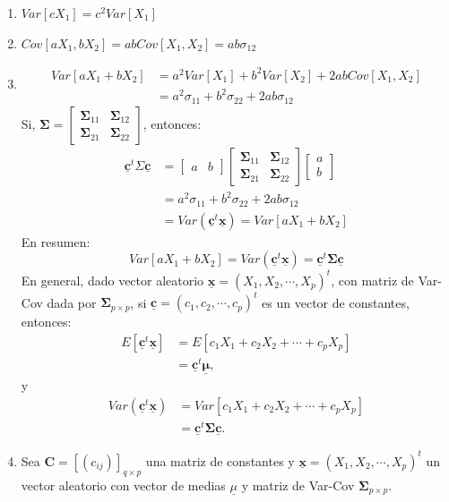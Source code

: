\documentclass[
]{book}
\theoremstyle{definition}
\theoremstyle{definition}
\theoremstyle{definition}
\theoremstyle{definition}
\theoremstyle{remark}
\begin{document}
\begin{enumerate}
\def\labelenumi{\arabic{enumi}.}
\setcounter{enumi}{2}
\item
  \(Var[cX_1]=c^2 Var[X_1]\)
\item
  \(Cov[aX_1,bX_2]=abCov[X_1,X_2]=ab\sigma_{12}\)
\item
  \begin{align*}
  Var[aX_1+bX_2]&=a^2Var[X_1]+b^2Var[X_2]+2abCov[X_1,X_2]\\
  &=a^2\sigma_{11}+b^2\sigma_{22}+2ab\sigma_{12}
  \end{align*}
  Si, \(\mathbf{\Sigma} = \begin{bmatrix} \mathbf{\Sigma}_{11} & \mathbf{\Sigma}_{12} \\ \mathbf{\Sigma}_{21} & \mathbf{\Sigma}_{22} \end{bmatrix}\), entonces:
  \begin{align*}
  \underline{\mathbf{c}}^t \Sigma \underline{\mathbf{c}}&= \begin{bmatrix}
  a & b
  \end{bmatrix}\begin{bmatrix}
  \mathbf{\Sigma}_{11} & \mathbf{\Sigma}_{12} \\
  \mathbf{\Sigma}_{21} & \mathbf{\Sigma}_{22}
  \end{bmatrix}\begin{bmatrix}
  a \\ b
  \end{bmatrix}\\&
    =a^2\sigma_{11}+b^2\sigma_{22}+2ab\sigma_{12}\\
  &=
  Var(\underline{\mathbf{c}}^t\underline{\mathbf{x}})=Var[aX_1+bX_2]
  \end{align*}
  En resumen:
  \[
  Var[aX_1+bX_2]=Var(\underline{\mathbf{c}}^t\underline{\mathbf{x}})=\underline{\mathbf{c}}^t \mathbf{\Sigma} \underline{\mathbf{c}}
  \]
  En general, dado vector aleatorio \(\underline{\mathbf{x}}=(X_1,X_2,\cdots, X_p)^t\), con matriz de Var-Cov dada por \(\mathbf{\Sigma}_{p \times p}\), si \(\underline{\mathbf{c}}=(c_1,c_2,\cdots,c_p)^t\) es un vector de constantes, entonces:
  \begin{align*}
  E[\underline{\mathbf{c}}^t\underline{\mathbf{x}}]&=E[c_1X_1+c_2X_2+\cdots+c_pX_p]\\
  &=\underline{\mathbf{c}}^t \underline{\mathbf{\mu}},
  \end{align*}
  y
  \begin{align*}
  Var(\underline{\mathbf{c}}^t\underline{\mathbf{x}})&=Var[c_1X_1+c_2X_2+\cdots+c_pX_p]\\
  &=\underline{\mathbf{c}}^t \mathbf{\Sigma} \underline{\mathbf{c}}.
  \end{align*}
\item
  Sea \(\mathbf{C}=[(c_{ij})]_{q \times p}\) una matriz de constantes y \(\underline{\mathbf{x}}=(X_1,X_2,\cdots, X_p)^t\) un vector aleatorio con vector de medias \(\underline{\mu}\) y matriz de Var-Cov \(\mathbf{\Sigma}_{p\times p}\).
\end{enumerate}
\end{document}

